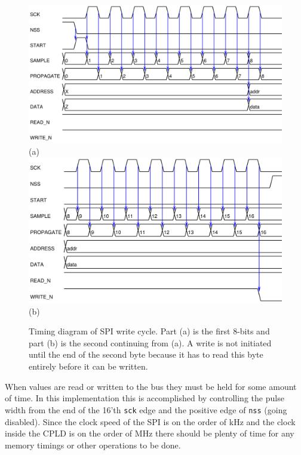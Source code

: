 \documentclass{article}
\begin{document}
\begin{figure}
\center
\includegraphics[scale=0.7]{figure/spi_ctl-timing/write-byte1} \\
(a) \\
\includegraphics[scale=0.7]{figure/spi_ctl-timing/write-byte2} \\
(b)
\caption{Timing diagram of SPI write cycle.
Part (a) is the first 8-bits and part (b) is the second
continuing from (a).
A write is not initiated until the end of the
second byte because it has to read this byte entirely before it can be written.}
\label{fig:spi_write}
\end{figure}

When values are read or written to the bus they must be held for
some amount of time.
In this implementation this is accomplished by controlling the
pulse width from the end of the 16'th \verb+sck+ edge and the positive
edge of \verb+nss+ (going disabled).
Since the clock speed of the SPI is on the order of kHz and the
clock inside the CPLD is on the order of MHz there should be plenty
of time for any memory timings or other operations to be done.
\end{document}
